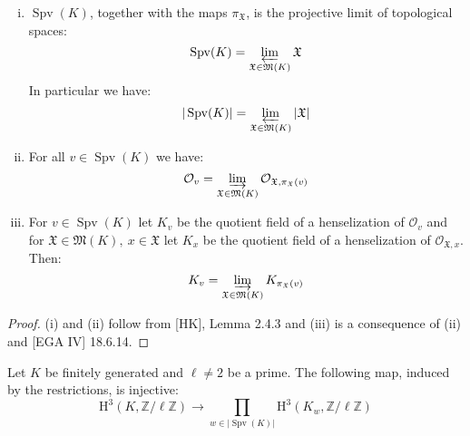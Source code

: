 \begin{lemma}\label{2.3}
\begin{enumerate}[(i)]
\item $\operatorname{Spv}(K)$, together with the maps $\pi_{\mathfrak{X}}$, is the projective limit of topological spaces: 
\[\operatorname{Spv}(K) =\varprojlim_{\mathfrak{X}\in\mathfrak{M}(K)}\mathfrak{X}\]
In particular we have:
\[ |\operatorname{Spv}(K)| =\varprojlim_{\mathfrak{X}\in\mathfrak{M}(K)}|\mathfrak{X}| \]
\item For all $v\in\operatorname{Spv}(K)$ we have:
\[ \mathcal{O}_v = \varinjlim_{\mathfrak{X}\in\mathfrak{M}(K)}\mathcal{O}_{\mathfrak{X},\pi_\mathfrak{X}(v)} \]
\item For $v\in\operatorname{Spv}(K)$ let $K_v$ be the quotient field of a henselization of $\mathcal{O}_v$ and for $\mathfrak{X}\in\mathfrak{M}(K),\ x\in\mathfrak{X}$ let $K_x$ be the quotient field of a henselization of $\mathcal{O}_{\mathfrak{X},x}$. Then:
\[ K_v=\varinjlim_{\mathfrak{X}\in\mathfrak{M}(K)}K_{\pi_\mathfrak{X}(v)} \]
\end{enumerate}
\end{lemma}

\begin{proof}
(i) and (ii) follow from [HK], Lemma 2.4.3 and (iii) is a consequence of (ii) and [EGA IV] 18.6.14.
\end{proof}

\begin{lemma}\label{2.4-finitelygenerated}
Let $K$ be finitely generated and $\ell\neq 2$ be a prime. The following map, induced by the restrictions, is injective:
\[ \mathrm{H}^3(K,\mathbb{Z}/\ell\mathbb{Z})\to\prod_{w\in |\operatorname{Spv}(K)| }\mathrm{H}^3(K_w,\mathbb{Z}/\ell\mathbb{Z}) \]
\end{lemma}

